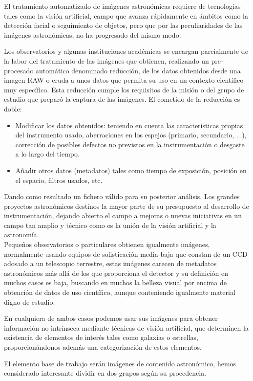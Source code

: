 	El tratamiento automatizado de imágenes astronómicas requiere de tecnologías tales como la visión artificial, campo que avanza rápidamente en ámbitos como la detección facial o seguimiento de objetos, pero que por las peculiaridades de las imágenes astronómicas, no ha progresado del mismo modo.
	
	Los observatorios y algunas instituciones académicas se encargan parcialmente de la labor del tratamiento de las imágenes que obtienen, realizando un pre-procesado automático denominado reducción, de los datos obtenidos desde una imagen RAW o cruda a unos datos que permita su uso en un contexto científico muy específico. Esta reducción cumple los requisitos de la misión o del grupo de estudio que preparó la captura de las imágenes. El cometido de la reducción es doble:
	\begin{itemize}
	\item Modificar los datos obtenidos: teniendo en cuenta las características propias del instrumento usado, aberraciones en los espejos (primario, secundario, ...), corrección de posibles defectos no previstos en la instrumentación o desgaste a lo largo del tiempo.
	\item Añadir otros datos (metadatos) tales como tiempo de exposición, posición en el espacio, filtros usados, etc. 
	\end{itemize}
	Dando como resultado un fichero válido para su posterior análisis. Los grandes proyectos astronómicos destinos la mayor parte de su presupuesto al desarrollo de instrumentación, dejando abierto el campo a mejoras o nuevas iniciativas en un campo tan amplio y técnico como es la unión de la visión artificial y la astronomía.\\
	Pequeños observatorios o particulares obtienen igualmente imágenes, normalmente usando equipos de sofisticación media-baja que constan de un CCD adosado a un telescopio terrestre, estas imágenes carecen de metadatos astronómicos más allá de los que proporciona el detector y su definición en muchos casos es baja, buscando en muchos la belleza visual por encima de obtención de datos de uso científico, aunque conteniendo igualmente material digno de estudio.
	
	En cualquiera de ambos casos podemos usar sus imágenes para obtener información no intrínseca mediante técnicas de visión artificial, que determinen la existencia de elementos de interés tales como galaxias o estrellas, proporcionándonos además una categorización de estos elementos.
	
	El elemento base de trabajo serán imágenes de contenido astronómico, hemos considerado interesante dividir en dos grupos según su procedencia. 
	
